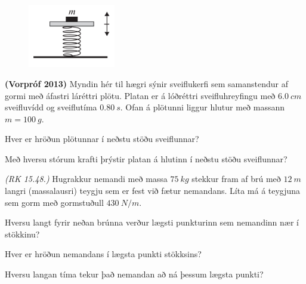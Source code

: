 \begin{enumerate}[label = \textbf{Dæmi \thechapter.\arabic*.}]
\begin{minipage}{\linewidth}

\begin{figure}
\vspace{-0.5cm}
\includegraphics[width = 1.5in]{images/vorprof2013.png}
\end{figure}

\item \textbf{(Vorpróf 2013)} Myndin hér til hægri sýnir sveiflukerfi sem samanstendur af gormi með áfastri láréttri plötu. Platan er á lóðréttri sveifluhreyfingu með $\SI{6.0}{cm}$ sveifluvídd og sveiflutíma $\SI{0.80}{s}$. Ofan á plötunni liggur hlutur með massann $m = \SI{100}{g}$.
\begin{enumerate*}[label = \textbf{(\alph*)}]
    \item Hver er hröðun plötunnar í neðstu stöðu sveiflunnar?
    \item Með hversu stórum krafti þrýstir platan á hlutinn í neðstu stöðu sveiflunnar?
\end{enumerate*}
\end{minipage}

\vspace{0.2cm}

\item \textit{(RK 15.48.)} Hugrakkur nemandi með massa $\SI{75}{kg}$ stekkur fram af brú með $\SI{12}{m}$ langri (massalausri) teygju sem er fest við fætur nemandans. Líta má á teygjuna sem gorm með gormstuðull $\SI{430}{N/m}$.
\begin{enumerate*}[label = \textbf{(\alph*)}]
    \item Hversu langt fyrir neðan brúnna verður lægsti punkturinn sem nemandinn nær í stökkinu?
    \item Hver er hröðun nemandans í lægsta punkti stökksins?
    \item Hversu langan tíma tekur það nemandan að ná þessum lægsta punkti?
\end{enumerate*}

\end{enumerate}
